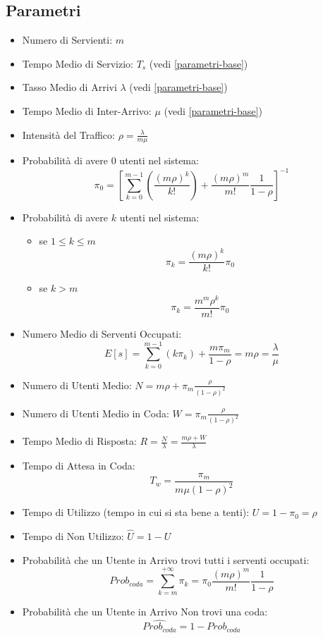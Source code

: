 \subsection{Parametri}

\begin{itemize}
    \item Numero di Servienti: $m$
    \item Tempo Medio di Servizio: $T_s$ (vedi \ref{parametri-base})
    \item Tasso Medio di Arrivi $\lambda$ (vedi \ref{parametri-base})
    \item Tempo Medio di Inter-Arrivo: $\mu$ (vedi \ref{parametri-base})
    \item Intensità del Traffico: $\rho = \frac{\lambda}{m \mu}$
    \item Probabilità di avere $0$ utenti nel sistema:
          $$\pi_0 = \left [ \sum_{k=0}^{m-1} \left ( \frac{(m \rho)^k}{k!}
                  \right ) + \frac{(m \rho)^m}{m!} \frac{1}{1-\rho} \right ]^{-1}$$
    \item Probabilità di avere $k$ utenti nel sistema:
          \begin{itemize}
              \item[\emoji{orangutan}] se $1 \leq k \leq m$ $$\pi_k = \frac{(m
                          \rho)^k}{k!} \pi_0$$
              \item[\emoji{gorilla}] se $k > m$ $$\pi_k = \frac{m^m \rho^k}{m!}
                      \pi_0$$
          \end{itemize}
    \item Numero Medio di Serventi Occupati: $$E[s] = \sum_{k=0}^{m-1} \left (
              k\pi_k \right ) + \frac{m\pi_m}{1-\rho}  = m \rho = \frac{\lambda}{\mu}$$
    \item Numero di Utenti Medio: $N = m \rho + \pi_m \frac{\rho}{(1-\rho)^2}$
    \item Numero di Utenti Medio in Coda: $W = \pi_m \frac{\rho}{(1-\rho)^2}$
    \item Tempo Medio di Risposta: $R = \frac{N}{\lambda} = \frac{m \rho +
                  W}{\lambda}$
    \item Tempo di Attesa in Coda: $$T_w = \frac{\pi_m}{m\mu (1-\rho)^2}$$
    \item Tempo di Utilizzo (tempo in cui si sta bene a tenti): $U = 1 - \pi_0 =
              \rho$
    \item Tempo di Non Utilizzo: $\hat{U} = 1 - U$
    \item Probabilità che un Utente in Arrivo trovi tutti i serventi occupati:
          $$Prob_{coda} = \sum_{k=m}^{+\infty} \pi_k = \pi_0 \frac{(m\rho)^m}{m!}
              \frac{1}{1-\rho}$$
    \item Probabilità che un Utente in Arrivo Non trovi una coda:
          $$\hat{Prob_{coda}} = 1 - Prob_{coda}$$
\end{itemize}

